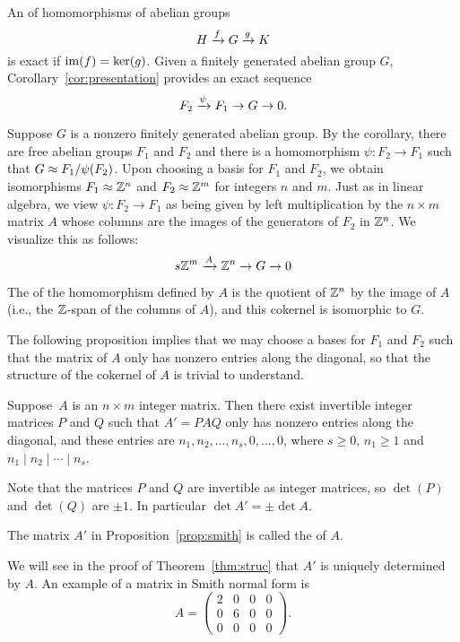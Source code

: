 An  of homomorphisms of abelian groups
$$
	H \xrightarrow{f} G \xrightarrow{g} K
$$
is exact if $\operatorname{im}(f) = \ker(g)$.
Given a finitely generated abelian group $G$,
Corollary~\ref{cor:presentation} provides an exact sequence
$$
	F_2 \xrightarrow{\psi} F_1 \to G \to 0.
$$

Suppose $G$ is a nonzero finitely generated abelian group.  By the
corollary, there are free abelian groups $F_1$ and $F_2$ and there is a
homomorphism $\psi:F_2 \to F_1$ such that $G\approx F_1/\psi(F_2)$.
Upon choosing a basis for $F_1$ and $F_2$, we obtain isomorphisms
$F_1\approx \mathbb{Z}^n$ and $F_2\approx \mathbb{Z}^m$ for integers $n$ and $m$.
Just as in linear algebra, we view $\psi:F_2\to F_1$ as being given
by left multiplication by the $n\times m$ matrix $A$ whose columns
are the images of the generators of $F_2$ in $\mathbb{Z}^n$.  We visualize
this as follows:
$$
	s\mathbb{Z}^m \xrightarrow{A} \mathbb{Z}^n \to G \to 0
$$

The  of the homomorphism defined by $A$ is the quotient
of $\mathbb{Z}^n$ by the image of $A$ (i.e., the $\mathbb{Z}$-span of the columns of $A$),
and this cokernel is isomorphic to $G$.

The following proposition implies that we may choose a bases for $F_1$
and $F_2$ such that the matrix of $A$ only has nonzero entries along
the diagonal, so that the structure of the cokernel of $A$ is
trivial to understand.

\begin{proposition}
	\label{prop:smith}
	Suppose~$A$ is an $n\times m$ integer matrix.  Then there exist
	invertible integer matrices $P$ and $Q$ such that $A'=PAQ$ only
	has nonzero entries along the diagonal, and these entries are
	$n_1, n_2,\ldots, n_s,0,\ldots,0$, where
	$s\geq 0$, $n_1\geq 1$ and $n_1\mid n_2 \mid{} \cdots \mid{} n_s$.
\end{proposition}

\begin{remark}
	Note that the matrices $P$ and $Q$ are invertible as integer
	matrices, so $\det(P)$ and $\det(Q)$ are $\pm 1$. In particular
	$\det A' = \pm\det A$.
\end{remark}

\begin{definition}
	The matrix $A'$ in Proposition~\ref{prop:smith}
	is called the  of $A$.
\end{definition}

We will see in the proof of Theorem~\ref{thm:struc} that
$A'$ is uniquely determined by $A$.
An example of a matrix in Smith normal form is
$$
	A=\left(\begin{matrix}
		2&0&0&0\\
		0&6&0&0\\
		0&0&0&0
	\end{matrix}\right).
$$

